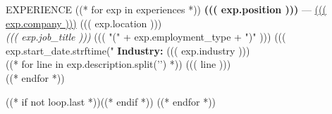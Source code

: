 \documentclass{resume}
\begin{document}

\begin{rSection}{EXPERIENCE}
((* for exp in experiences *))
    \textbf{((( exp.position )))} — \href{((( exp.company_url )))}{((( exp.company )))} \hfill ((( exp.location ))) \\
    \textit{((( exp.job_title )))} ((( "(" + exp.employment_type + ")" ))) \hfill ((( exp.start_date.strftime("%
    \textbf{Industry:} ((( exp.industry ))) \\

    ((* for line in exp.description.split('\n') *))
        ((( line ))) \\
    ((* endfor *))

    ((* if not loop.last *))\vspace{0.3cm}((* endif *))
((* endfor *))
\end{rSection}
\end{document}
